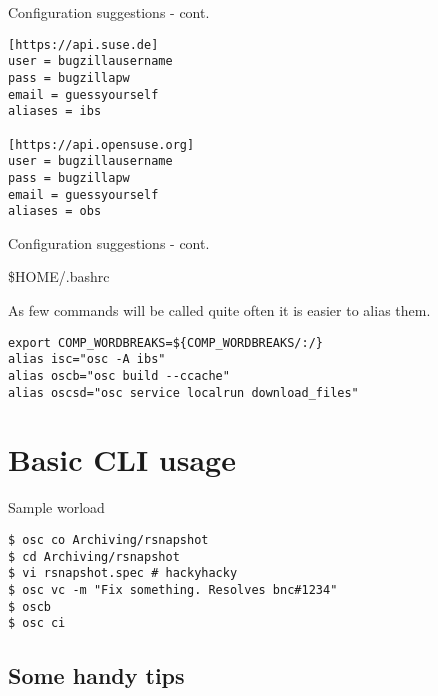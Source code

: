 \documentclass{beamer}
\begin{document}
\begin{frame}[fragile]{Configuration suggestions - cont.}
	\begin{small}
	\begin{verbatim}
[https://api.suse.de]
user = bugzillausername
pass = bugzillapw
email = guessyourself
aliases = ibs

[https://api.opensuse.org]
user = bugzillausername
pass = bugzillapw
email = guessyourself
aliases = obs
	\end{verbatim}
	\end{small}
\end{frame}

\begin{frame}[fragile]{Configuration suggestions - cont.}
	\begin{center}\$HOME/.bashrc\end{center}
	As few commands will be called quite often it is easier to alias them.
	\begin{tiny}
	\begin{verbatim}
export COMP_WORDBREAKS=${COMP_WORDBREAKS/:/}
alias isc="osc -A ibs"
alias oscb="osc build --ccache"
alias oscsd="osc service localrun download_files"
	\end{verbatim}
	\end{tiny}
\end{frame}

\section{Basic CLI usage}

\begin{frame}[fragile]{Sample worload}
	\begin{small}
	\begin{verbatim}
$ osc co Archiving/rsnapshot
$ cd Archiving/rsnapshot
$ vi rsnapshot.spec # hackyhacky
$ osc vc -m "Fix something. Resolves bnc#1234"
$ oscb
$ osc ci
	\end{verbatim}
	\end{small}
\end{frame}

\subsection{Some handy tips}
\end{document}
